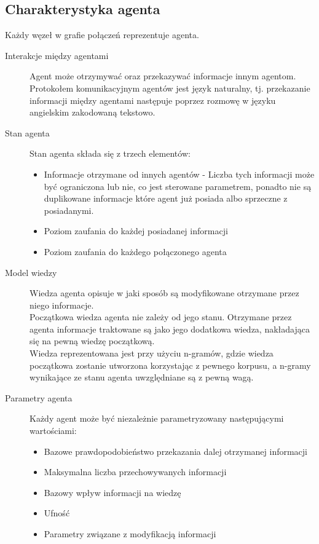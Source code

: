 \documentclass{article}
\begin{document}
	\subsection{Charakterystyka agenta}
	Każdy węzeł w grafie połączeń reprezentuje agenta.
	\begin{description}
		\item[Interakcje między agentami]
		Agent może otrzymywać oraz przekazywać informacje innym agentom.
		Protokołem komunikacyjnym agentów jest język naturalny, tj.
		przekazanie informacji między agentami następuje poprzez rozmowę
		w języku angielskim zakodowaną tekstowo.
		\item[Stan agenta]
		Stan agenta składa się z trzech elementów:
		\begin{itemize}
			\item {Informacje otrzymane od innych agentów - 
			Liczba tych informacji może być ograniczona lub nie, co jest sterowane parametrem,
			ponadto nie są duplikowane informacje które agent już posiada albo sprzeczne z posiadanymi.}
			\item {Poziom zaufania do każdej posiadanej informacji}
			\item {Poziom zaufania do każdego połączonego agenta}
		\end{itemize}	
		\item[Model wiedzy]
		Wiedza agenta opisuje w jaki sposób są modyfikowane otrzymane przez niego informacje.\\
		Początkowa wiedza agenta nie zależy od jego stanu.
		Otrzymane przez agenta informacje traktowane są jako jego dodatkowa wiedza,
		nakładająca się na pewną wiedzę początkową.\\
		Wiedza reprezentowana jest przy użyciu n-gramów,
		gdzie wiedza początkowa zostanie utworzona korzystając z pewnego korpusu,
		a n-gramy wynikające ze stanu agenta uwzględniane są z pewną wagą.
		\item[Parametry agenta] Każdy agent może być niezależnie parametryzowany następującymi wartościami:
		\begin{itemize}
			\item{Bazowe prawdopodobieństwo przekazania dalej otrzymanej informacji}
			\item{Maksymalna liczba przechowywanych informacji}
			\item{Bazowy wpływ informacji na wiedzę}
			\item{Ufność}
			\item{Parametry związane z modyfikacją informacji}
		\end{itemize}
	\end{description}
\end{document}
